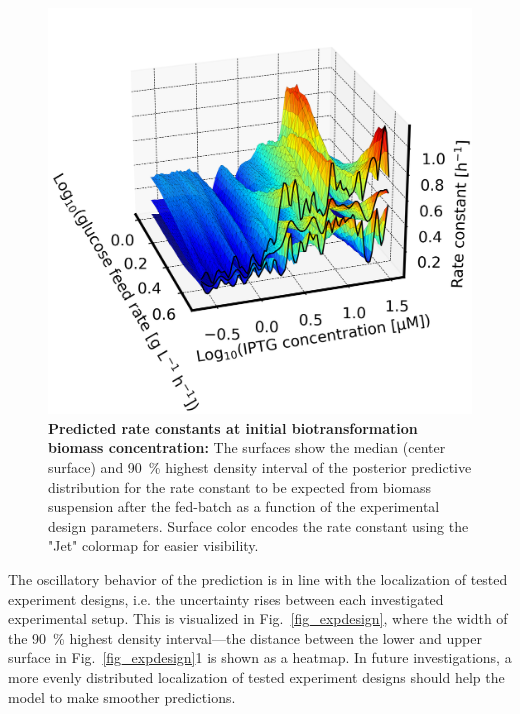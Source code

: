 \documentclass[sn-standardnature]{sn-jnl}%
\theoremstyle{thmstyleone}%
\theoremstyle{thmstyletwo}%
\theoremstyle{thmstylethree}%
\begin{document}
\begin{figure}[h]
    \centering
    \includegraphics[width=1.0\textwidth]{figures/plot_3d_pp_dense_k_design.png}
    \caption{
        \textbf{Predicted rate constants at initial biotransformation biomass concentration:}
        The surfaces show the median (center surface) and 90~\% highest density interval of the posterior predictive distribution for the rate constant to be expected from biomass suspension after the fed-batch as a function of the experimental design parameters.
        Surface color encodes the rate constant using the "Jet" colormap \cite{matplotlibDocs} for easier visibility.
    }
    \label{fig_3Dkdesign}
\end{figure}

The oscillatory behavior of the prediction is in line with the localization of tested experiment designs, i.e. the uncertainty rises between each investigated experimental setup.
This is visualized in Fig.~\ref{fig_expdesign}, where the width of the 90~\% highest density interval---the distance between the lower and upper surface in Fig.~\ref{fig_expdesign}1 is shown as a heatmap.
In future investigations, a more evenly distributed localization of tested experiment designs should help the model to make smoother predictions.
\end{document}
